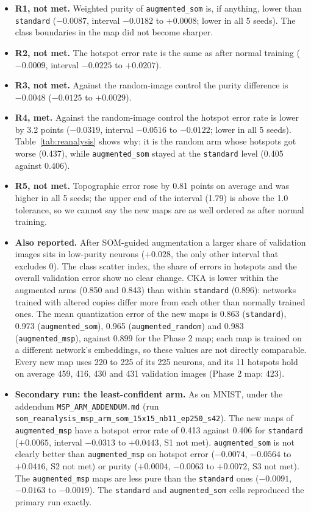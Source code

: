 \documentclass[11pt]{article}
\begin{document}
\begin{itemize}[leftmargin=1.4em, itemsep=2pt]
  \item \textbf{R1, not met.} Weighted purity of \texttt{augmented\_som} is, if anything, lower than \texttt{standard} ($-0.0087$, interval $-0.0182$ to $+0.0008$; lower in all 5 seeds). The class boundaries in the map did not become sharper.
  \item \textbf{R2, not met.} The hotspot error rate is the same as after normal training ($-0.0009$, interval $-0.0225$ to $+0.0207$).
  \item \textbf{R3, not met.} Against the random-image control the purity difference is $-0.0048$ ($-0.0125$ to $+0.0029$).
  \item \textbf{R4, met.} Against the random-image control the hotspot error rate is lower by 3.2 points ($-0.0319$, interval $-0.0516$ to $-0.0122$; lower in all 5 seeds). Table~\ref{tab:reanalysis} shows why: it is the random arm whose hotspots got worse (0.437), while \texttt{augmented\_som} stayed at the \texttt{standard} level (0.405 against 0.406).
  \item \textbf{R5, not met.} Topographic error rose by 0.81 points on average and was higher in all 5 seeds; the upper end of the interval (1.79) is above the 1.0 tolerance, so we cannot say the new maps are as well ordered as after normal training.
  \item \textbf{Also reported.} After SOM-guided augmentation a larger share of validation images sits in low-purity neurons ($+0.028$, the only other interval that excludes 0). The class scatter index, the share of errors in hotspots and the overall validation error show no clear change. CKA is lower within the augmented arms (0.850 and 0.843) than within \texttt{standard} (0.896): networks trained with altered copies differ more from each other than normally trained ones. The mean quantization error of the new maps is 0.863 (\texttt{standard}), 0.973 (\texttt{augmented\_som}), 0.965 (\texttt{augmented\_random}) and 0.983 (\texttt{augmented\_msp}), against 0.899 for the Phase 2 map; each map is trained on a different network's embeddings, so these values are not directly comparable. Every new map uses 220 to 225 of its 225 neurons, and its 11 hotspots hold on average 459, 416, 430 and 431 validation images (Phase 2 map: 423).
  \item \textbf{Secondary run: the least-confident arm.} As on MNIST, under the addendum \texttt{MSP\_ARM\_ADDENDUM.md} (run \texttt{som\_reanalysis\_msp\_arm\_som\_15x15\_nb11\_ep250\_s42}). The new maps of \texttt{augmented\_msp} have a hotspot error rate of 0.413 against 0.406 for \texttt{standard} ($+0.0065$, interval $-0.0313$ to $+0.0443$, S1 not met). \texttt{augmented\_som} is not clearly better than \texttt{augmented\_msp} on hotspot error ($-0.0074$, $-0.0564$ to $+0.0416$, S2 not met) or purity ($+0.0004$, $-0.0063$ to $+0.0072$, S3 not met). The \texttt{augmented\_msp} maps are less pure than the \texttt{standard} ones ($-0.0091$, $-0.0163$ to $-0.0019$). The \texttt{standard} and \texttt{augmented\_som} cells reproduced the primary run exactly.
\end{itemize}
\end{document}
